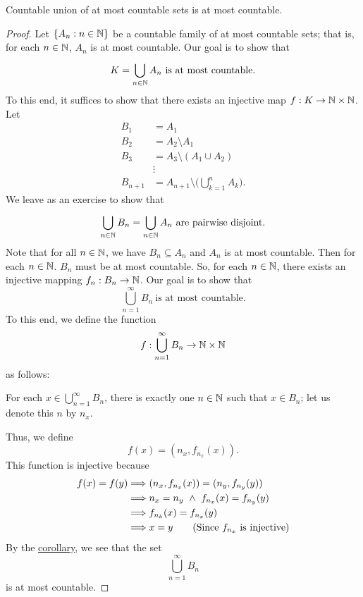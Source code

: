 \documentclass[a4paper]{report}
\begin{document}
\begin{theorem}[ ]\label{Countable union of at most countable sets is at most countable}
   Countable union of at most countable sets is at most countable.
\end{theorem}
\begin{proof}
    Let \( \{ {A}_{n} : n \in \mathbb{N}  \} \) be a countable family of at most countable sets; that is, for each \( n \in \mathbb{N}  \), \( {A}_{n} \) is at most countable. Our goal is to show that 
    \[  K = \bigcup_{ n \in \N  }^{  }  {A}_{n} \ \text{is at most countable.} \]
    To this end, it suffices to show that there exists an injective map \( f: K \to \mathbb{N} \times \mathbb{N}  \). Let 
    \begin{align*}
        {B}_{1} &= {A}_{1} \\
        {B}_{2} &= {A}_{2} \setminus  {A}_{1} \\
        {B}_{3} &= {A}_{3} \setminus  ({A}_{1} \cup {A}_{2}) \\
                &\vdots \\
        {B}_{n+1} &= {A}_{n+1} \setminus  \Big(  \bigcup_{ k=1  }^{ n }  {A}_{k} \Big).
    \end{align*}
    We leave as an exercise to show that 
        \[  \bigcup_{ n \in \mathbb{N}  }^{   }  {B}_{n} = \bigcup_{ n \in \mathbb{N}  }^{  }  {A}_{n} \ \text{are pairwise disjoint}. \]
       Note that for all \( n \in \mathbb{N}  \), we have \( {B}_{n} \subseteq  {A}_{n} \) and \( {A}_{n}  \) is at most countable. Then for each \( n \in \mathbb{N}  \). \( {B}_{n} \) must be at most countable. So, for each \( n \in \mathbb{N}  \), there exists an injective mapping \( {f}_{n}: {B}_{n} \to \mathbb{N} \). Our goal is to show that  
       \[  \bigcup_{ n =1  }^{ \infty  } {B}_{n} \ \text{is at most countable}. \]
       To this end, we define the function 
       \[  f: \bigcup_{ n=1  }^{ \infty  }  {B}_{n} \to \mathbb{N} \times \mathbb{N} \]
       as follows:
       \begin{center}
           For each \( x \in \bigcup_{ n = 1  }^{ \infty  } {B}_{n} \), there is exactly one \( n \in \mathbb{N}  \) such that \( x \in {B}_{n} \); let us denote this \( n  \) by \( {n}_{x} \).  
       \end{center}
       Thus, we define 
       \[  f(x) = ({n}_{x}, {f}_{{n}_{x}}(x)). \]
       This function is injective because
       \begin{align*}
           f(x) = f(y) &\Longrightarrow ({n}_{x}, {f}_{{n}_{x}}(x)) = ({n}_{y}, {f}_{{n}_{y}}(y)) \\
                       &\Longrightarrow {n}_{x} = {n}_{y} \ \wedge \ {f}_{{n}_{x}}(x) = {f}_{{n}_{y}}(y) \\
                       &\Longrightarrow {f}_{{n}_{k}}(x) = {f}_{{n}_{x}}(y) \\
                       &\Longrightarrow x =y \tag{Since \( {f}_{{n}_{x}}  \) is injective}
       \end{align*}
       By the {\hyperref[Injective mapping implies at most countability]{corollary}}, we see that the set 
       \[  \bigcup_{ n =1  }^{  \infty  }  {B}_{n} \] is at most countable.
\end{proof}
\end{document}
